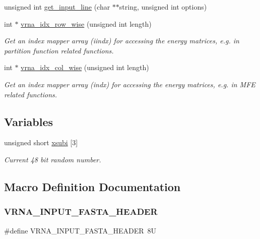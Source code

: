\begin{DoxyCompactItemize}
unsigned int \mbox{\hyperlink{group__utils_ga8ef1835eb83f542396f59f0b205965e5}{get\+\_\+input\+\_\+line}} (char $\ast$$\ast$string, unsigned int options)
\item 
int $\ast$ \mbox{\hyperlink{group__utils_ga70b180e9ea764218a82647a1cd347445}{vrna\+\_\+idx\+\_\+row\+\_\+wise}} (unsigned int length)
\begin{DoxyCompactList}\small\item\em Get an index mapper array (iindx) for accessing the energy matrices, e.\+g. in partition function related functions. \end{DoxyCompactList}\item 
int $\ast$ \mbox{\hyperlink{group__utils_ga89ebc69c52fa0c78c9e1974b0017746b}{vrna\+\_\+idx\+\_\+col\+\_\+wise}} (unsigned int length)
\begin{DoxyCompactList}\small\item\em Get an index mapper array (indx) for accessing the energy matrices, e.\+g. in M\+FE related functions. \end{DoxyCompactList}\end{DoxyCompactItemize}
\subsection*{Variables}
\begin{DoxyCompactItemize}
\item 
unsigned short \mbox{\hyperlink{group__utils_gaf9a866c8417afda7368bbac939ab3c47}{xsubi}} \mbox{[}3\mbox{]}
\begin{DoxyCompactList}\small\item\em Current 48 bit random number. \end{DoxyCompactList}\end{DoxyCompactItemize}


\subsection{Macro Definition Documentation}
\mbox{\label{group__utils_ga2f0d8069e93d3ac54d9320d6bdb8e7e7}} 
\subsubsection{\texorpdfstring{VRNA\_INPUT\_FASTA\_HEADER}{VRNA\_INPUT\_FASTA\_HEADER}}
{\footnotesize\ttfamily \#define V\+R\+N\+A\+\_\+\+I\+N\+P\+U\+T\+\_\+\+F\+A\+S\+T\+A\+\_\+\+H\+E\+A\+D\+ER~8U}




